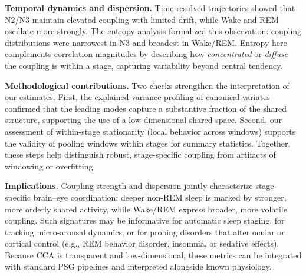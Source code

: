 \textbf{Temporal dynamics and dispersion.}
Time-resolved trajectories showed that N2/N3 maintain elevated coupling with limited drift, while Wake and REM oscillate more strongly. The entropy analysis formalized this observation: coupling distributions were narrowest in N3 and broadest in Wake/REM. Entropy here complements correlation magnitudes by describing how \emph{concentrated} or \emph{diffuse} the coupling is within a stage, capturing variability beyond central tendency.

\textbf{Methodological contributions.}
Two checks strengthen the interpretation of our estimates. First, the explained-variance profiling of canonical variates confirmed that the leading modes capture a substantive fraction of the shared structure, supporting the use of a low-dimensional shared space. Second, our assessment of within-stage stationarity (local behavior across windows) supports the validity of pooling windows within stages for summary statistics. Together, these steps help distinguish robust, stage-specific coupling from artifacts of windowing or overfitting.

\textbf{Implications.}
Coupling strength and dispersion jointly characterize stage-specific brain--eye coordination: deeper non-REM sleep is marked by stronger, more orderly shared activity, while Wake/REM express broader, more volatile coupling. Such signatures may be informative for automatic sleep staging, for tracking micro-arousal dynamics, or for probing disorders that alter ocular or cortical control (e.g., REM behavior disorder, insomnia, or sedative effects). Because CCA is transparent and low-dimensional, these metrics can be integrated with standard PSG pipelines and interpreted alongside known physiology.

